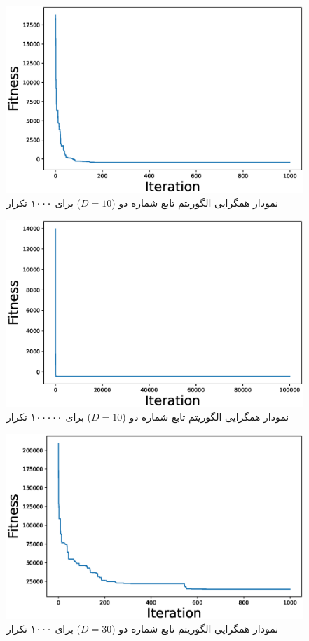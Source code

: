  \begin{figure}[H]
	\caption{نمودار همگرایی الگوریتم  تابع شماره دو ($D=10$) برای ۱۰۰۰ تکرار } 
	\centering 
	\includegraphics[width=16cm]{../Figure/Q1/PSO_II_convergence_curve_10_ite_1000} 
\end{figure}


\begin{figure}[H]
	\caption{نمودار همگرایی الگوریتم  تابع شماره دو ($D=10$) برای ۱۰۰۰۰۰ تکرار } 
	\centering 
	\includegraphics[width=16cm]{../Figure/Q1/PSO_II_convergence_curve_10_ite_100000} 
\end{figure}

 \begin{figure}[H]
	\caption{نمودار همگرایی الگوریتم  تابع شماره دو ($D=30$) برای ۱۰۰۰ تکرار } 
	\centering 
	\includegraphics[width=16cm]{../Figure/Q1/PSO_II_convergence_curve_30_ite_1000} 
\end{figure}

